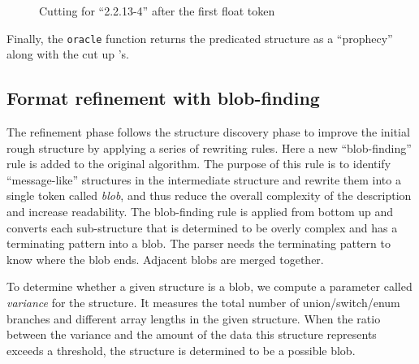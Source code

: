 \begin{figure}[th]
\begin{center}
\end{center}
\caption{Cutting \seqset{} for ``2.2.13-4'' after the first float token} \label{fig:cut}
\end{figure}

Finally, the {\tt oracle} function returns the predicated structure as a ``prophecy''
along with the cut up \seqset's. 

\subsection{Format refinement with blob-finding}
The refinement phase follows the structure discovery phase to
improve the initial rough structure by applying a series of
rewriting rules. Here a new ``blob-finding'' rule is added to
the original algorithm. The purpose of this rule is to identify
``message-like'' structures in the intermediate structure and rewrite them into
a single token called {\em blob}, and thus reduce the overall complexity
of the description and increase readability. The blob-finding rule is applied
from bottom up and converts each sub-structure that is
determined to be overly complex and has a terminating pattern into a
blob. The \pads{} parser needs the terminating pattern to
know where the blob ends. Adjacent blobs are merged together. 

To determine whether a given structure is a blob, 
we compute a parameter called {\em variance} for the structure. 
It measures the total number of union/switch/enum
branches and different array lengths in the given 
structure. When the ratio between the variance and the amount of the data
this structure represents exceeds a threshold, the structure is
determined to be a possible blob. 
